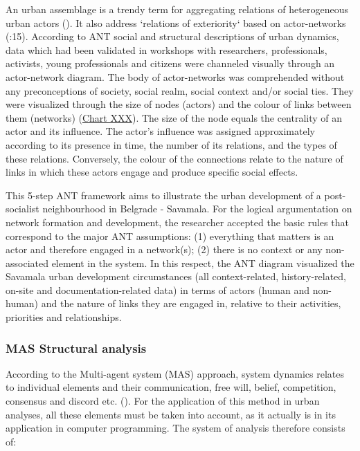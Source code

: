 \documentclass[11pt]{report}
\begin{document}
{{{{\begin{enumerate}
An urban assemblage is a trendy term for aggregating relations of heterogeneous urban actors (\href{Muniesa}{\citealt{muniesa_introduction_2007}}). It also address `relations of exteriority` based on actor-networks (\href{Farias}{\citealt{farias_politics_2011}}:15).
According to ANT social and structural descriptions of urban dynamics, data which had been validated in workshops with researchers, professionals, activists, young professionals and citizens were channeled visually through an actor-network diagram. The body of actor-networks was comprehended without any preconceptions of society, social realm, social context and/or social ties. They were visualized through the size of nodes (actors) and the colour of links between them (networks) (\href{Table ANT discource analysos}{Chart XXX}). The size of the node equals the centrality of an actor and its influence. The actor’s influence was assigned approximately according to its presence in time, the number of its relations, and the types of these relations. Conversely, the colour of the connections relate to the nature of links in which these actors engage and produce specific social effects.
\end{enumerate}

This 5-step ANT framework aims to illustrate the urban development of a post-socialist neighbourhood in Belgrade - Savamala. For the logical argumentation on network formation and development, the researcher accepted the basic rules that correspond to the major ANT assumptions: (1) everything that matters is an actor and therefore engaged in a network(s); (2) there is no context or any non-associated element in the system. In this respect, the ANT diagram visualized the Savamala urban development circumstances (all context-related, history-related, on-site and documentation-related data) in terms of actors (human and non-human) and the nature of links they are engaged in, relative to their activities, priorities and relationships.


\subsubsection{MAS Structural analysis}

According to the Multi-agent system (MAS) approach, system dynamics relates to individual elements and their communication, free will, belief, competition, consensus and discord etc. (\href{Ferber}{\citealt{ferber_multi-agent_1999}}).
For the application of this method in urban analyses, all these elements must be taken into account, as it actually is in its application in computer programming. The system of analysis therefore consists of:

}}}}
\end{document}
